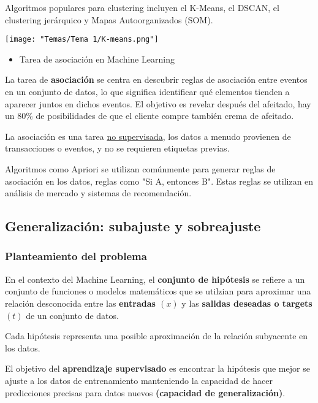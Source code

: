 Algoritmos populares para clustering incluyen el K-Means, el DSCAN, el clustering jerárquico y Mapas Autoorganizados (SOM).

\begin{center}
	\texttt{[image: "Temas/Tema 1/K-means.png"]}
\end{center}
\begin{itemize}[label=\color{red}\textbullet, leftmargin=*]
	\item \color{lightblue}Tarea de asociación en Machine Learning
\end{itemize}

La tarea de \textbf{asociación} se centra en descubrir reglas de asociación entre eventos en un conjunto de datos, lo que significa identificar qué elementos tienden a aparecer juntos en dichos eventos. El objetivo es revelar después del afeitado, hay un 80\% de posibilidades de que el cliente compre también crema de afeitado.

La asociación es una tarea \underline{no supervisada}, los datos a menudo provienen de transacciones o eventos, y no se requieren etiquetas previas.

Algoritmos como Apriori se utilizan comúnmente para generar reglas de asociación en los datos, reglas como "Si A, entonces B". Estas reglas se utilizan en análisis de mercado y sistemas de recomendación.
\subsection{Generalización: subajuste y sobreajuste}
\subsubsection{Planteamiento del problema}
En el contexto del Machine Learning, el \textbf{conjunto de hipótesis} se refiere a un conjunto de funciones o modelos matemáticos que se utilzian para aproximar una relación desconocida entre las \textbf{entradas $(x)$} y las \textbf{salidas deseadas o targets $(t)$} de un conjunto de datos.

Cada hipótesis representa una posible aproximación de la relación subyacente en los datos.

El objetivo del \textbf{aprendizaje supervisado} es encontrar la hipótesis que mejor se ajuste a los datos de entrenamiento manteniendo la capacidad de hacer predicciones precisas para datos nuevos \textbf{(capacidad de generalización)}.

